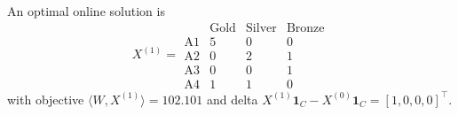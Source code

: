 \documentclass[11pt]{article}
\begin{document}
An optimal online solution is
\[
X^{(1)}=
\begin{array}{c|ccc}
 & \text{Gold} & \text{Silver} & \text{Bronze} \\\hline
\text{A1} & 5 & 0 & 0 \\
\text{A2} & 0 & 2 & 1 \\
\text{A3} & 0 & 0 & 1 \\
\text{A4} & 1 & 1 & 0
\end{array}
\]
with objective $\langle W,X^{(1)}\rangle=102.101$ and delta
$X^{(1)}\mathbf{1}_C-X^{(0)}\mathbf{1}_C=[1,0,0,0]^\top$.
\end{document}
